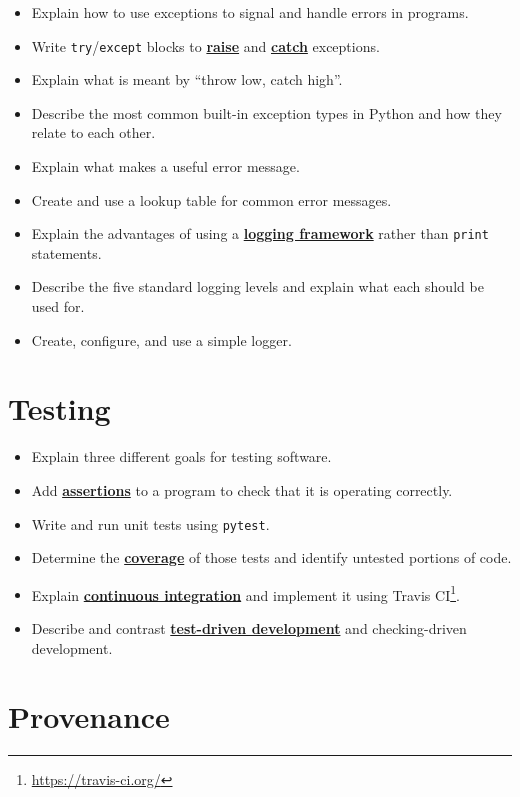 \documentclass[
]{krantz}
\providecommand{\tightlist}{%
  \setlength{\itemsep}{0pt}\setlength{\parskip}{0pt}}
\renewcommand{\href}[2]{#2\footnote{\url{#1}}}
\newcommand{\gref}[2]{\hyperlink{#2}{\textbf{#1}}}
\begin{document}
\begin{itemize}
\tightlist
\item
  Explain how to use exceptions to signal and handle errors in programs.
\item
  Write \texttt{try}/\texttt{except} blocks to \gref{raise}{raise\_exception} and \gref{catch}{catch\_exception} exceptions.
\item
  Explain what is meant by ``throw low, catch high''.
\item
  Describe the most common built-in exception types in Python and how they relate to each other.
\item
  Explain what makes a useful error message.
\item
  Create and use a lookup table for common error messages.
\item
  Explain the advantages of using a \gref{logging framework}{logging\_framework} rather than \texttt{print} statements.
\item
  Describe the five standard logging levels and explain what each should be used for.
\item
  Create, configure, and use a simple logger.
\end{itemize}

\hypertarget{testing-1}{%
\section{Testing}\label{testing-1}}

\begin{itemize}
\tightlist
\item
  Explain three different goals for testing software.
\item
  Add \gref{assertions}{assertion} to a program to check that it is operating correctly.
\item
  Write and run unit tests using \texttt{pytest}.
\item
  Determine the \gref{coverage}{code\_coverage} of those tests and identify untested portions of code.
\item
  Explain \gref{continuous integration}{continuous\_integration} and implement it using \href{https://travis-ci.org/}{Travis CI}.
\item
  Describe and contrast \gref{test-driven development}{tdd} and checking-driven development.
\end{itemize}

\hypertarget{provenance-1}{%
\section{Provenance}\label{provenance-1}}
\end{document}
